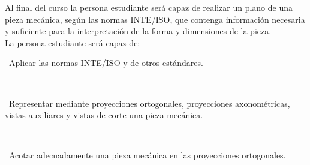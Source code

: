 \documentclass[letterpaper]{article}%
\begin{document}
\begin{tcolorbox}[
blanker,
width=0.78\textwidth,enlarge left by=0.24\textwidth,
before skip=6pt,
breakable,
overlay unbroken and first={%
    \node[inner sep=0pt,outer sep=0pt,text width=0.22\textwidth,
    align=none,
    below right]
    at ([xshift=-0.24\textwidth]frame.north west)
{
\hspace*{0mm}\fontsize{12}{14}\selectfont \textbf{\textcolor{parte}{3 Objetivos}}
};}]
Al final del curso la persona estudiante será capaz de realizar un plano de una pieza mecánica, según las normas INTE/ISO, que contenga información necesaria y suficiente para la interpretación de la forma y dimensiones de la pieza.\\
La persona estudiante será capaz de:\\
\hspace*{0.02\linewidth}\parbox{0.98\linewidth}{\strut\textbullet\, Aplicar las normas INTE/ISO y de otros estándares.
\strut}\\
\hspace*{0.02\linewidth}\parbox{0.98\linewidth}{\strut\textbullet\, Representar mediante proyecciones ortogonales, proyecciones axonométricas, vistas auxiliares y vistas de corte una pieza mecánica.
\strut}\\
\hspace*{0.02\linewidth}\parbox{0.98\linewidth}{\strut\textbullet\, Acotar adecuadamente una pieza mecánica en las proyecciones ortogonales.\strut}\\
 
\end{tcolorbox}
%
\vspace*{10mm}%
\end{document}
